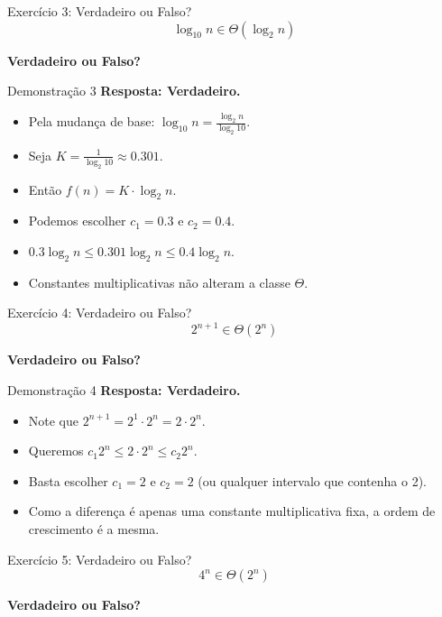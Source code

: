 \documentclass[aspectratio=169]{beamer}
\begin{document}
\begin{frame}{Exercício 3: Verdadeiro ou Falso?}
    \Large
    \[ \log_{10} n \in \Theta(\log_{2} n) \]
    \begin{center}
        \textbf{Verdadeiro ou Falso?}
    \end{center}
\end{frame}

\begin{frame}{Demonstração 3}
    \textbf{Resposta: Verdadeiro.}
    \begin{itemize}
        \item Pela mudança de base: $\log_{10} n = \frac{\log_{2} n}{\log_{2} 10}$.
        \item Seja $K = \frac{1}{\log_{2} 10} \approx 0.301$.
        \item Então $f(n) = K \cdot \log_{2} n$.
        \item Podemos escolher $c_1 = 0.3$ e $c_2 = 0.4$.
        \item $0.3 \log_2 n \le 0.301 \log_2 n \le 0.4 \log_2 n$.
        \item Constantes multiplicativas não alteram a classe $\Theta$.
    \end{itemize}
\end{frame}

\begin{frame}{Exercício 4: Verdadeiro ou Falso?}
    \Large
    \[ 2^{n+1} \in \Theta(2^n) \]
    \begin{center}
        \textbf{Verdadeiro ou Falso?}
    \end{center}
\end{frame}

\begin{frame}{Demonstração 4}
    \textbf{Resposta: Verdadeiro.}
    \begin{itemize}
        \item Note que $2^{n+1} = 2^1 \cdot 2^n = 2 \cdot 2^n$.
        \item Queremos $c_1 2^n \le 2 \cdot 2^n \le c_2 2^n$.
        \item Basta escolher $c_1 = 2$ e $c_2 = 2$ (ou qualquer intervalo que contenha o 2).
        \item Como a diferença é apenas uma constante multiplicativa fixa, a ordem de crescimento é a mesma.
    \end{itemize}
\end{frame}

\begin{frame}{Exercício 5: Verdadeiro ou Falso?}
    \Large
    \[ 4^n \in \Theta(2^n) \]
    \begin{center}
        \textbf{Verdadeiro ou Falso?}
    \end{center}
\end{frame}
\end{document}
